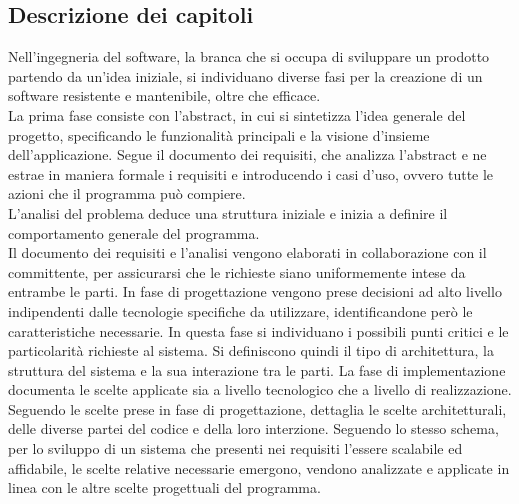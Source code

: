 \clearpage

\subsection*{Descrizione dei capitoli}

Nell'ingegneria del software, la branca che si occupa di sviluppare un prodotto partendo da un'idea iniziale, 
si individuano diverse fasi per la creazione di un software resistente e mantenibile, oltre che efficace.\\

    La prima fase consiste con l'abstract, in cui si sintetizza l'idea generale del progetto, 
    specificando le funzionalità principali e la visione d'insieme dell'applicazione.
    Segue il documento dei requisiti, che analizza l'abstract e ne estrae in maniera formale i requisiti e introducendo i casi d'uso, 
    ovvero tutte le azioni che il programma può compiere.\\
    L'analisi del problema deduce una struttura iniziale e inizia a definire il comportamento generale del programma.\\
    Il documento dei requisiti e l'analisi vengono elaborati in collaborazione con il committente, 
    per assicurarsi che le richieste siano uniformemente intese da entrambe le parti.
    In fase di progettazione vengono prese decisioni ad alto livello indipendenti dalle tecnologie specifiche da utilizzare, 
    identificandone però le caratteristiche necessarie. 
    In questa fase si individuano i possibili punti critici e le particolarità richieste al sistema.
    Si definiscono quindi il tipo di architettura, la struttura del sistema e la sua interazione tra le parti.
    La fase di implementazione documenta le scelte applicate sia a livello tecnologico che a livello di realizzazione. 
    Seguendo le scelte prese in fase di progettazione, dettaglia le scelte architetturali, delle diverse partei del codice e della loro interzione.
Seguendo lo stesso schema, per lo sviluppo di un sistema che presenti nei requisiti l'essere scalabile ed affidabile, 
le scelte relative necessarie emergono, vendono analizzate e applicate in linea con le altre scelte progettuali del programma.\\
\clearpage